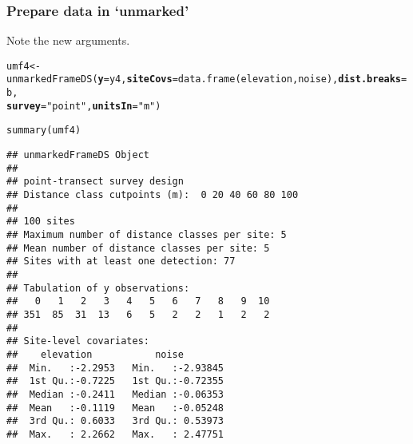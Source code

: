 \documentclass[color=usenames,dvipsnames]{beamer}\usepackage[]{graphicx}\usepackage[]{xcolor}
\makeatletter
\newcommand{\hlstr}[1]{\textcolor[rgb]{0.749,0.012,0.012}{#1}}%
\newcommand{\hlstd}[1]{\textcolor[rgb]{0,0,0}{#1}}%
\newcommand{\hlkwb}[1]{\textcolor[rgb]{0,0.341,0.682}{#1}}%
\newcommand{\hlkwc}[1]{\textcolor[rgb]{0,0,0}{\textbf{#1}}}%
\newcommand{\hlkwd}[1]{\textcolor[rgb]{0.004,0.004,0.506}{#1}}%
\newenvironment{kframe}{%
 \def\at@end@of@kframe{}%
 \ifinner\ifhmode%
  \def\at@end@of@kframe{\end{minipage}}%
  \begin{minipage}{\columnwidth}%
 \fi\fi%
 \def\FrameCommand##1{\hskip\@totalleftmargin \hskip-\fboxsep
 \colorbox{shadecolor}{##1}\hskip-\fboxsep
     \hskip-\linewidth \hskip-\@totalleftmargin \hskip\columnwidth}%
 \MakeFramed {\advance\hsize-\width
   \@totalleftmargin\z@ \linewidth\hsize
   \@setminipage}}%
 {\par\unskip\endMakeFramed%
 \at@end@of@kframe}
\newenvironment{knitrout}{}{} %
\makeatother
\begin{document}
\begin{frame}[fragile]
  \frametitle{Prepare data in `unmarked'}
  \small
  Note the new arguments.
  \vspace{-6pt}
\begin{knitrout}\tiny
{}\color{fgcolor}\begin{kframe}
\begin{alltt}
\hlstd{umf4} \hlkwb{<-} \hlkwd{unmarkedFrameDS}\hlstd{(}\hlkwc{y}\hlstd{=y4,} \hlkwc{siteCovs}\hlstd{=}\hlkwd{data.frame}\hlstd{(elevation,noise),} \hlkwc{dist.breaks}\hlstd{=b,}
                       \hlkwc{survey}\hlstd{=}\hlstr{"point"}\hlstd{,} \hlkwc{unitsIn}\hlstd{=}\hlstr{"m"}\hlstd{)}
\end{alltt}
\end{kframe}
\end{knitrout}
\pause
\begin{knitrout}\tiny
{}\color{fgcolor}\begin{kframe}
\begin{alltt}
\hlkwd{summary}\hlstd{(umf4)}
\end{alltt}
\begin{verbatim}
## unmarkedFrameDS Object
## 
## point-transect survey design
## Distance class cutpoints (m):  0 20 40 60 80 100 
## 
## 100 sites
## Maximum number of distance classes per site: 5 
## Mean number of distance classes per site: 5 
## Sites with at least one detection: 77 
## 
## Tabulation of y observations:
##   0   1   2   3   4   5   6   7   8   9  10 
## 351  85  31  13   6   5   2   2   1   2   2 
## 
## Site-level covariates:
##    elevation           noise         
##  Min.   :-2.2953   Min.   :-2.93845  
##  1st Qu.:-0.7225   1st Qu.:-0.72355  
##  Median :-0.2411   Median :-0.06353  
##  Mean   :-0.1119   Mean   :-0.05248  
##  3rd Qu.: 0.6033   3rd Qu.: 0.53973  
##  Max.   : 2.2662   Max.   : 2.47751
\end{verbatim}
\end{kframe}
\end{knitrout}
\end{frame}
\end{document}
